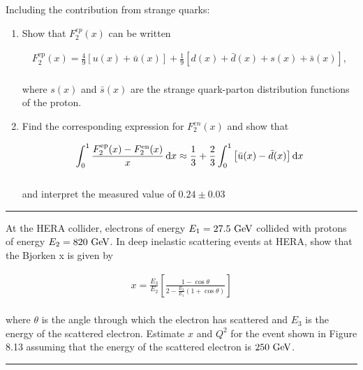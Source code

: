 \begin{problem}{8.7}
    Including the contribution from strange quarks:

    \begin{enumerate}[label=(\alph*)]
        \item Show that $F_2^{ep}(x)$ can be written 
        
        \begin{align*}
            F_2^{\text{ep}}(x) = \frac{4}{9} \left[ u(x) + \bar{u}(x) \right] + \frac{1}{9} \left[ d(x) + \bar{d}(x) + s(x) + \bar{s}(x) \right],
        \end{align*}\\
        where $s(x)$ and $\bar{s}(x)$ are the strange quark-parton distribution functions of the proton.
        \item Find the corresponding expression for $F_2^{en}(x)$ and show that
        
        \begin{align*}
            \int_0^1 \frac{F^{\text{ep}}_2(x)-F^{\text{en}}_2(x)}{x} \mathop{}\!\mathrm{d} x \approx \frac{1}{3} + \frac{2}{3} \int_0^1 \left[ \bar{u}(x) - \bar{d}(x) \right] \mathop{}\!\mathrm{d} x
        \end{align*}\\
        and interpret the measured value of $0.24\pm 0.03$
    \end{enumerate}
\end{problem}
\begin{solution}

\end{solution}

\noindent\rule{7in}{1.5pt}


\begin{problem}{8.8}
At the HERA collider, electrons of energy $E_1 = 27.5 \text{ GeV}$ collided with protons of energy $E_2 = 820 \text{ GeV}$. In deep inelastic scattering events at HERA, show that the Bjorken x is given by

\begin{align*}
    x = \frac{E_3}{E_2} \left[ \frac{1-\cos\theta}{2-\frac{E_3}{E_1}\left(1+\cos\theta\right)} \right]
\end{align*}\\
where $\theta$ is the angle through which the electron has scattered and $E_3$ is the energy of the scattered electron. Estimate $x$ and $Q^2$ for the event shown in Figure 8.13 assuming that the energy of the scattered electron is $250 \text{ GeV}$.
\end{problem}
\begin{solution}

\end{solution}

\noindent\rule{7in}{1.5pt}


